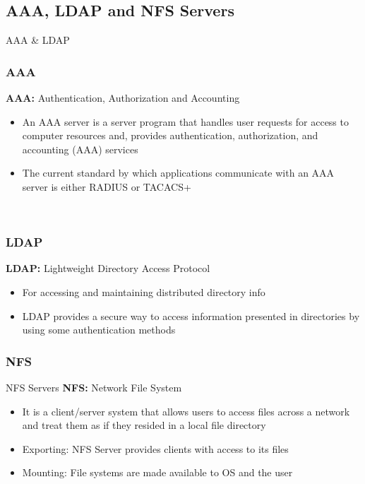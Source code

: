 \documentclass[10pt,xcolor=dvipsnames]{beamer}
\begin{document}
\subsection{AAA, LDAP and NFS Servers}
\begin{frame}{AAA \& LDAP }
\subsubsection{AAA}
\textbf{AAA:}
Authentication, Authorization and Accounting
\begin{itemize}
	\item An AAA server is a server program that handles user requests for access to computer resources and, provides authentication, authorization, and accounting (AAA) services
	\item The current standard by which applications communicate with an AAA server is either RADIUS or TACACS+
\end{itemize}
\underline{}\\
\subsubsection{LDAP}
\textbf{LDAP:}
Lightweight Directory Access Protocol
\begin{itemize}
	\item For accessing and maintaining distributed directory info
	\item LDAP provides a secure way to access information presented in directories by using some authentication methods
\end{itemize}
\end{frame}
\subsubsection{NFS}
\begin{frame}{NFS Servers}
\textbf{NFS:}
Network File System
\begin{itemize}
	\item It is a client/server system that allows users to access files across a network and treat them as if they resided in a local file directory
	\item Exporting: NFS Server provides clients with access to its files
	\item Mounting: File systems are made available to OS and the user	
\end{itemize}

\end{frame}
\end{document}
